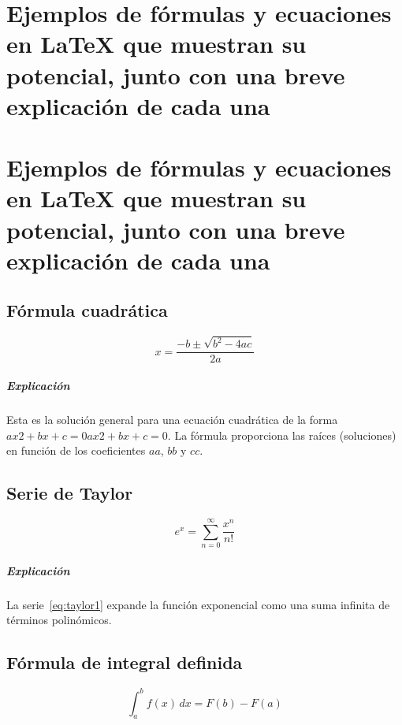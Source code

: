\ifPDF
\chapter{Ejemplos de fórmulas y ecuaciones en LaTeX que muestran su potencial, junto con una breve explicación de cada una}
\setcounter{PrimPag}{\theCurrentPage}
	\else
	\ifHTMLEPUB
	\chapter{Ejemplos de fórmulas y ecuaciones en LaTeX que muestran su potencial, junto con una breve explicación de cada una}
	\fi
\fi



\section{Fórmula cuadrática}

\[
x = \frac{-b \pm \sqrt{b^2 - 4ac}}{2a}
\]

\paragraph*{Explicación} Esta es la solución general para una ecuación cuadrática de la forma $ax2+bx+c=0ax2+bx+c=0$. La fórmula proporciona las raíces (soluciones) en función de los coeficientes $aa$, $bb$ y $cc$.

\section{Serie de Taylor}

\begin{equation}
\label{eq:taylor1}
e^x = \sum_{n=0}^{\infty} \frac{x^n}{n!}
\end{equation}

\paragraph*{Explicación} La serie~\ref{eq:taylor1} expande la función exponencial como una suma infinita de términos polinómicos.

\section{Fórmula de integral definida}

\[
\int_{a}^{b} f(x) \, dx = F(b) - F(a)
\]

